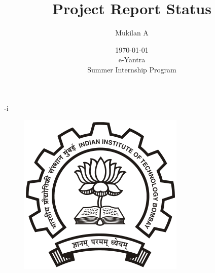 -i\documentclass[a4paper,12 pt]{article}
\begin{document}
\begin{figure}[t]
\begin{center}
\includegraphics[]{iitb.png}
\end{center}
\end{figure}
\title{\textbf{Project Report Status}}
\author{Mukilan A}
\date{\today \\ e-Yantra \\ Summer Internship Program   }
\maketitle
\pagebreak
\end{document}
